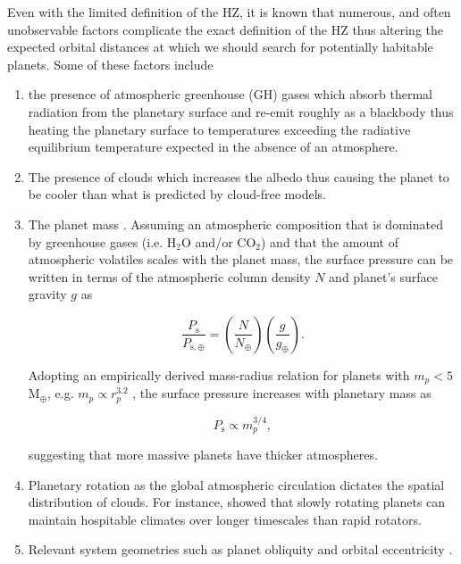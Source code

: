 Even with the limited definition of the 
HZ, it is known that numerous, and often unobservable factors complicate the 
exact definition of the HZ thus altering the expected orbital 
distances at which we should search for potentially habitable planets. 
Some of these factors include 

\begin{enumerate}
\item the presence of atmospheric greenhouse (GH) gases 
\citep{kasting93, kopparapu13} which 
absorb thermal radiation from the planetary surface and re-emit roughly as a 
blackbody thus heating the planetary surface to temperatures exceeding the 
radiative equilibrium temperature expected in the absence of an atmosphere. 
\item The presence of clouds \citep{selsis07, yang13} which increases the 
albedo thus causing the planet to be cooler than what is predicted by cloud-free 
models.
\item The planet mass \citep{kopparapu14}. Assuming an atmospheric composition 
that is dominated by greenhouse gases (i.e. H$_2$O and/or CO$_2$) and that the 
amount of atmospheric volatiles scales with the planet mass, the surface pressure 
can be written in terms of the atmospheric column density $N$ and planet's 
surface gravity $g$ as 

\begin{equation}
\frac{P_{\mathrm{s}}}{P_{\mathrm{s}, \oplus}} = \left( \frac{N}{N_{\oplus}} \right)
\left( \frac{g}{g_{\oplus}} \right).
\end{equation}

\noindent Adopting an empirically derived mass-radius relation for planets with 
$m_p < 5$ M$_{\oplus}$, e.g. $m_p \propto r_p^{3.2}$ \citep{kopparapu14}, 
the surface pressure increases with planetary mass as 

\begin{equation}
P_{\mathrm{s}} \propto m_p^{3/4}, 
\end{equation}

\noindent suggesting that more massive planets have thicker atmospheres.
\item Planetary rotation as the global atmospheric circulation dictates the 
spatial distribution of clouds. For instance, \citep{yang14} showed that 
slowly rotating planets can maintain hospitable climates over longer timescales than 
rapid rotators.
\item Relevant system geometries such as planet obliquity 
\citep{williams97, spiegel08, spiegel09} and orbital eccentricity 
\citep{dressing10, cowan12}. 
\end{enumerate}

